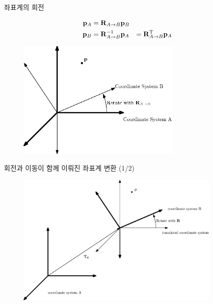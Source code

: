 \begin{frame}[fragile]{좌표계의 회전}

\begin{eqnarray}
\mathbf p_A &= \mathbf R_{A \rightarrow B} \mathbf p_B & \nonumber \\
\mathbf p_B &=  \mathbf R_{A \rightarrow B}^{-1} \mathbf p_A & =  \mathbf R_{A \rightarrow B}^{\rm T} \mathbf p_A  \nonumber
\end{eqnarray}

\begin{figure}
    \includegraphics[width=8cm]{Math_transform/coordinateRotate.eps}
\end{figure}




\end{frame}

\begin{frame}[fragile]{회전과 이동이 함께 이뤄진 좌표계 변환 (1/2)}

\begin{figure}
    \includegraphics[width=10cm]{Math_transform/coordinateTransform.eps}
\end{figure}


\end{frame}

